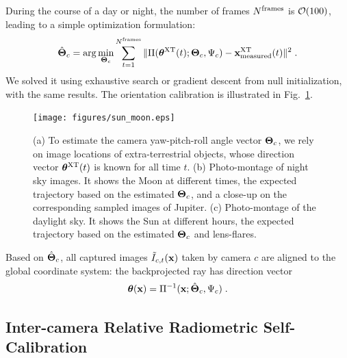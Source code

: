 \documentclass[runningheads]{llncs}
\begin{document}
During the course of a day or night, the number of frames
  $N^{\rm frames}$ is ${\cal O}(100)$, leading to a simple optimization formulation:
\begin{equation}
 \hat{\bf \Theta}_c=\arg\min_{{\bf \Theta}_c}
 \sum_{t=1}^{N^{\rm frames}}
 \|{\Pi}({\bm \theta}^{\rm XT}(t);{\bf \Theta}_c,\Psi_c) - {\bf x}^{\rm XT}_{\rm measured}(t)\|^2
\;.
 \label{eq:hatThetac}
\end{equation}
We solved it using exhaustive search or gradient descent from null initialization, with the same results. The orientation calibration is illustrated in Fig.~\ref{fig:sunmotion}.


\begin{figure}[t!]
\begin{center}
   \texttt{[image: figures/sun\_moon.eps]}
\end{center}
   \vspace{-0.6cm}
   \caption{(a) To estimate the camera yaw-pitch-roll angle vector ${\bf \Theta}_c$, we rely on
   image locations of extra-terrestrial objects, whose direction vector ${\bm \theta}^{\rm XT}(t)$
   is known for all time $t$. (b) Photo-montage of night sky images. It shows the Moon at different times, the expected trajectory based on the estimated ${\bf \Theta}_c$, and a close-up on the corresponding sampled images of Jupiter. (c) Photo-montage of the daylight sky. It shows the Sun at different hours, the expected trajectory based on the estimated ${\bf \Theta}_c$ and lens-flares.
   }
\label{fig:sunmotion}
\end{figure}
Based on $\hat{\bf \Theta}_c$, all captured images $\tilde I_{c,t}(\bf x)$ taken by camera $c$ are aligned to the global coordinate system:
the backprojected ray has direction vector %
\begin{equation}
 {\bm \theta}({\bf x})={\Pi}^{-1}({\bf x};\hat{\bf{\Theta}}_c,\Psi_c)
  \;.
 \label{eq:thetac}
\end{equation}



\subsection{Inter-camera Relative Radiometric Self-Calibration}
\label{sec:mutiradio}
\end{document}
